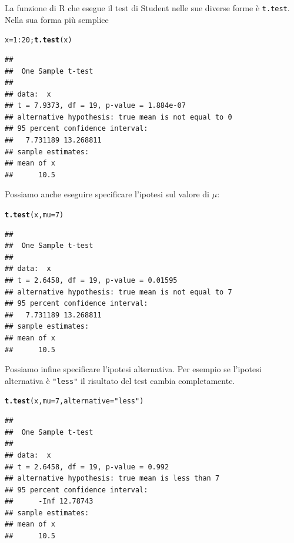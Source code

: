 \documentclass[onecolumn,12pt]{book}\usepackage[]{graphicx}\usepackage[]{color}
\makeatletter
\newcommand{\hlnum}[1]{\textcolor[rgb]{0.686,0.059,0.569}{#1}}%
\newcommand{\hlstr}[1]{\textcolor[rgb]{0.192,0.494,0.8}{#1}}%
\newcommand{\hlopt}[1]{\textcolor[rgb]{0,0,0}{#1}}%
\newcommand{\hlstd}[1]{\textcolor[rgb]{0.345,0.345,0.345}{#1}}%
\newcommand{\hlkwb}[1]{\textcolor[rgb]{0.69,0.353,0.396}{#1}}%
\newcommand{\hlkwc}[1]{\textcolor[rgb]{0.333,0.667,0.333}{#1}}%
\newcommand{\hlkwd}[1]{\textcolor[rgb]{0.737,0.353,0.396}{\textbf{#1}}}%
\newenvironment{kframe}{%
 \def\at@end@of@kframe{}%
 \ifinner\ifhmode%
  \def\at@end@of@kframe{\end{minipage}}%
  \begin{minipage}{\columnwidth}%
 \fi\fi%
 \def\FrameCommand##1{\hskip\@totalleftmargin \hskip-\fboxsep
 \colorbox{shadecolor}{##1}\hskip-\fboxsep
     \hskip-\linewidth \hskip-\@totalleftmargin \hskip\columnwidth}%
 \MakeFramed {\advance\hsize-\width
   \@totalleftmargin\z@ \linewidth\hsize
   \@setminipage}}%
 {\par\unskip\endMakeFramed%
 \at@end@of@kframe}
\newenvironment{knitrout}{}{} %
\newcommand{\virgolette}{\selectlanguage{english}\texttt{"}\selectlanguage{italian}}
\makeatother
\begin{document}
La funzione di
\textsf{R} che esegue il test di Student nelle sue diverse forme \`e  \texttt{t.test}.   Nella sua forma pi\`u semplice

\begin{knitrout}
\color{fgcolor}\begin{kframe}
\begin{alltt}
\hlstd{x}\hlkwb{=}\hlnum{1}\hlopt{:}\hlnum{20}\hlstd{;}  \hlkwd{t.test}\hlstd{(x)}
\end{alltt}
\begin{verbatim}
## 
## 	One Sample t-test
## 
## data:  x
## t = 7.9373, df = 19, p-value = 1.884e-07
## alternative hypothesis: true mean is not equal to 0
## 95 percent confidence interval:
##   7.731189 13.268811
## sample estimates:
## mean of x 
##      10.5
\end{verbatim}
\end{kframe}
\end{knitrout}
Possiamo anche eseguire specificare l'ipotesi sul valore di $\mu$:
\begin{knitrout}
\color{fgcolor}\begin{kframe}
\begin{alltt}
\hlkwd{t.test}\hlstd{(x,}\hlkwc{mu}\hlstd{=}\hlnum{7}\hlstd{)}
\end{alltt}
\begin{verbatim}
## 
## 	One Sample t-test
## 
## data:  x
## t = 2.6458, df = 19, p-value = 0.01595
## alternative hypothesis: true mean is not equal to 7
## 95 percent confidence interval:
##   7.731189 13.268811
## sample estimates:
## mean of x 
##      10.5
\end{verbatim}
\end{kframe}
\end{knitrout}
Possiamo infine specificare l'ipotesi alternativa. Per esempio se l'ipotesi alternativa \`e
\texttt{\virgolette less\virgolette}  il risultato del test cambia completamente.
\begin{knitrout}
\color{fgcolor}\begin{kframe}
\begin{alltt}
\hlkwd{t.test}\hlstd{(x,}\hlkwc{mu}\hlstd{=}\hlnum{7}\hlstd{,} \hlkwc{alternative}\hlstd{=}\hlstr{"less"}\hlstd{)}
\end{alltt}
\begin{verbatim}
## 
## 	One Sample t-test
## 
## data:  x
## t = 2.6458, df = 19, p-value = 0.992
## alternative hypothesis: true mean is less than 7
## 95 percent confidence interval:
##      -Inf 12.78743
## sample estimates:
## mean of x 
##      10.5
\end{verbatim}
\end{kframe}
\end{knitrout}
\end{document}
